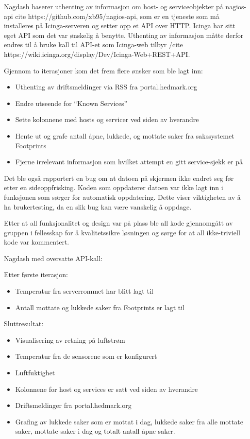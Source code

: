 Nagdash baserer uthenting av informasjon om host- og serviceobjekter på nagios-api cite https://github.com/xb95/nagios-api, som er en tjeneste som må installeres på Icinga-serveren og setter opp et API over HTTP. Icinga har sitt eget API som det var ønskelig å benytte. Uthenting av informasjon måtte derfor endres til å bruke kall til API-et som Icinga-web tilbyr /cite https://wiki.icinga.org/display/Dev/Icinga-Web+REST+API.

Gjennom to iterasjoner kom det frem flere ønsker som ble lagt inn:
\begin{itemize}
	 \item Uthenting av driftsmeldinger via RSS fra portal.hedmark.org
	 \item Endre utseende for “Known Services”
	 \item Sette kolonnene med hosts og servicer ved siden av hverandre 
	 \item Hente ut og grafe antall åpne, lukkede, og mottate saker fra sakssystemet Footprints
	 \item Fjerne irrelevant informasjon som hvilket attempt en gitt service-sjekk er på
\end{itemize}

Det ble også rapportert en bug om at datoen på skjermen ikke endret seg før etter en sideoppfrisking. Koden som oppdaterer datoen var ikke lagt inn i funksjonen som sørger for automatisk oppdatering. Dette viser viktigheten av å ha brukertesting, da en slik bug kan være vanskelig å oppdage.

Etter at all funksjonalitet og design var på plass ble all kode gjennomgått av gruppen i fellesskap for å kvalitetssikre løsningen og sørge for at all ikke-triviell kode var kommentert.


Nagdash med oversatte API-kall:


Etter første iterasjon:
\begin{itemize}
	\item Temperatur fra serverrommet har blitt lagt til
	\item Antall mottate og lukkede saker fra Footprints er lagt til
\end{itemize}


Sluttresultat:
\begin{itemize}
	\item Visualisering av retning på luftstrøm
	\item Temperatur fra de sensorene som er konfigurert
	\item Luftfuktighet
	\item Kolonnene for host og services er satt ved siden av hverandre
	\item Driftsmeldinger fra portal.hedmark.org
	\item Grafing av lukkede saker som er mottat i dag, lukkede saker fra alle mottate saker,
	mottate saker i dag og totalt antall åpne saker.
\end{itemize}

